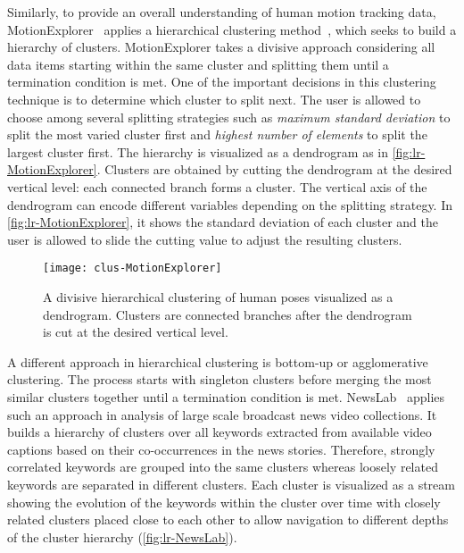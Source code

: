 Similarly, to provide an overall understanding of human motion tracking data, MotionExplorer~\cite{Bernard2013} applies a hierarchical clustering method~\cite{Han2011}, which seeks to build a hierarchy of clusters. MotionExplorer takes a divisive approach considering all data items starting within the same cluster and splitting them until a termination condition is met. One of the important decisions in this clustering technique is to determine which cluster to split next. The user is allowed to choose among several splitting strategies such as \emph{maximum standard deviation} to split the most varied cluster first and \emph{highest number of elements} to split the largest cluster first. The hierarchy is visualized as a dendrogram as in \autoref{fig:lr-MotionExplorer}. Clusters are obtained by cutting the dendrogram at the desired vertical level: each connected branch forms a cluster. The vertical axis of the dendrogram can encode different variables depending on the splitting strategy. In \autoref{fig:lr-MotionExplorer}, it shows the standard deviation of each cluster and the user is allowed to slide the cutting value to adjust the resulting clusters.

\begin{figure}
	\centering
	\texttt{[image: clus-MotionExplorer]}
	\caption[A divisive hierarchical clustering of human poses]{A divisive hierarchical clustering of human poses visualized as a dendrogram. Clusters are connected branches after the dendrogram is cut at the desired vertical level. }
	\label{fig:lr-MotionExplorer}
\end{figure}

A different approach in hierarchical clustering is bottom-up or agglomerative clustering. The process starts with singleton clusters before merging the most similar clusters together until a termination condition is met. NewsLab~\cite{Ghoniem2007} applies such an approach in analysis of large scale broadcast news video collections. It builds a hierarchy of clusters over all keywords extracted from available video captions based on their co-occurrences in the news stories. Therefore, strongly correlated keywords are grouped into the same clusters whereas loosely related keywords are separated in different clusters. Each cluster is visualized as a stream showing the evolution of the keywords within the cluster over time with closely related clusters placed close to each other to allow navigation to different depths of the cluster hierarchy (\autoref{fig:lr-NewsLab}).


